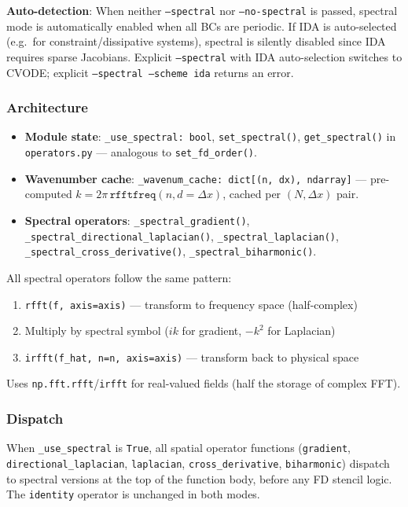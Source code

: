 \textbf{Auto-detection}: When neither \texttt{--spectral} nor \texttt{--no-spectral} is passed,
spectral mode is automatically enabled when all BCs are periodic. If IDA
is auto-selected (e.g.\ for constraint/dissipative systems), spectral is
silently disabled since IDA requires sparse Jacobians. Explicit \texttt{--spectral}
with IDA auto-selection switches to CVODE; explicit \texttt{--spectral --scheme ida}
returns an error.

\subsubsection{Architecture}
\label{sec:spectral-architecture}

\begin{itemize}
  \item \textbf{Module state}: \texttt{\_use\_spectral: bool}, \texttt{set\_spectral()}, \texttt{get\_spectral()}
    in \texttt{operators.py} --- analogous to \texttt{set\_fd\_order()}.
  \item \textbf{Wavenumber cache}: \texttt{\_wavenum\_cache: dict[(n, dx), ndarray]} --- pre-computed
    $k = 2\pi\,\texttt{rfftfreq}(n, d=\Delta x)$, cached per $(N, \Delta x)$ pair.
  \item \textbf{Spectral operators}: \texttt{\_spectral\_gradient()}, \texttt{\_spectral\_directional\_laplacian()},
    \texttt{\_spectral\_laplacian()}, \texttt{\_spectral\_cross\_derivative()}, \texttt{\_spectral\_biharmonic()}.
\end{itemize}

All spectral operators follow the same pattern:
\begin{enumerate}
  \item \texttt{rfft(f, axis=axis)} --- transform to frequency space (half-complex)
  \item Multiply by spectral symbol ($ik$ for gradient, $-k^2$ for Laplacian)
  \item \texttt{irfft(f\_hat, n=n, axis=axis)} --- transform back to physical space
\end{enumerate}

Uses \texttt{np.fft.rfft}/\texttt{irfft} for real-valued fields (half the storage of
complex FFT).

\subsubsection{Dispatch}
\label{sec:spectral-dispatch}

When \texttt{\_use\_spectral} is \texttt{True}, all spatial operator functions (\texttt{gradient},
\texttt{directional\_laplacian}, \texttt{laplacian}, \texttt{cross\_derivative}, \texttt{biharmonic})
dispatch to spectral versions at the top of the function body, before any
FD stencil logic. The \texttt{identity} operator is unchanged in both modes.

